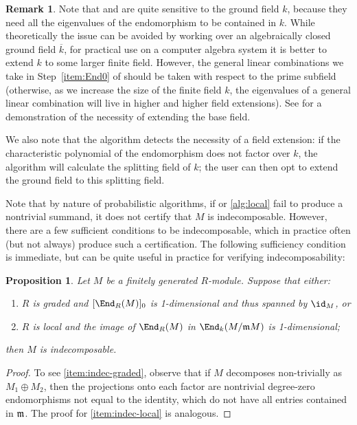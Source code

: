 \documentclass[12pt]{article}
\let\bar\overline
\theoremstyle{theorem}
\numberwithin{thm}{section}
\newtheorem{prop}[thm]{Proposition}
\theoremstyle{definition}
\newtheorem{rem}[thm]{Remark}
\begin{document}
\begin{rem}\label{rem:extension}
  Note that  and  are quite sensitive to the ground field $k$, because they need all the eigenvalues of the endomorphism to be contained in $k$. While theoretically the issue can be avoided by working over an algebraically closed ground field $\bar k$, for practical use on a computer algebra system it is better to extend $k$ to some larger finite field. However, the general linear combinations we take in Step~\ref{item:End0} of  should be taken with respect to the prime subfield (otherwise, as we increase the size of the finite field $k$, the eigenvalues of a general linear combination will live in higher and higher field extensions).
  See  for a demonstration of the necessity of extending the base field.

  We also note that the algorithm detects the necessity of a field extension: if the characteristic polynomial of the endomorphism does not factor over $k$, the algorithm will calculate the splitting field of $k$; the user can then opt to extend the ground field to this splitting field.
\end{rem}

Note that by nature of probabilistic algorithms, if  or \ref{alg:local} fail to produce a nontrivial summand, it does not certify that $M$ is indecomposable. However, there are a few sufficient conditions to be indecomposable, which in practice often (but not always) produce such a certification. The following sufficiency condition is immediate, but can be quite useful in practice for verifying indecomposability:

\begin{prop}\label{prop:indecomposability}
  Let $M$ be a finitely generated $R$-module. Suppose that either:
  \begin{enumerate}
  \item\label{item:indec-graded} $R$ is graded and $[\End_R(M)]_0$ is 1-dimensional and thus spanned by $\id_M$, or
  \item\label{item:indec-local} $R$ is local and the image of $\End_R(M)$ in $\End_k(M/\m M)$ is 1-dimensional;
  \end{enumerate}
  then $M$ is indecomposable.
\end{prop}
\begin{proof}
  To see \eqref{item:indec-graded}, observe that if $M$ decomposes non-trivially as $M_1\oplus M_2$, then the projections onto each factor are nontrivial degree-zero endomorphisms not equal to the identity, which do not have all entries contained in $\mathfrak m$. The proof for \eqref{item:indec-local} is analogous.
\end{proof}
\end{document}

